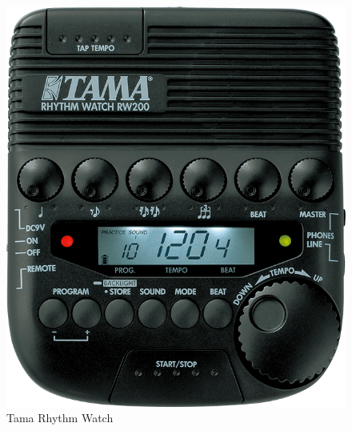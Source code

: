 \documentclass[a4paper, 11pt]{article}
\begin{document}
\begin{figure}[htbp]
	\centering
	\includegraphics[scale=0.2]{RW200}
	\caption{Tama Rhythm Watch}%
	\label{fig: RW200}
\end{figure}
\end{document}
